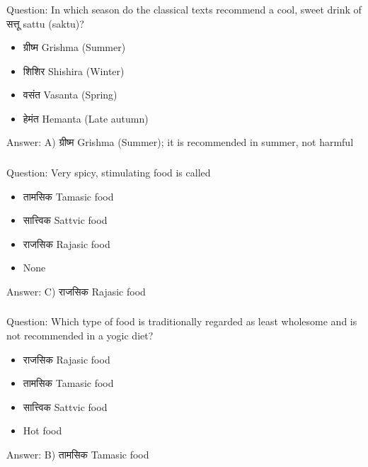 \begin{frame}[fragile]\frametitle{}

Question: In which season do the classical texts recommend a cool, sweet drink of सत्तू sattu (saktu)?

\begin{itemize}
\item[A)] ग्रीष्म Grishma (Summer)
\item[B)] शिशिर Shishira (Winter)
\item[C)] वसंत Vasanta (Spring)
\item[D)] हेमंत Hemanta (Late autumn)
\end{itemize}

Answer: A) ग्रीष्म Grishma (Summer); it is recommended in summer, not harmful
\end{frame}

\begin{frame}[fragile]\frametitle{}

Question: Very spicy, stimulating food is called

\begin{itemize}
\item[A)] तामसिक Tamasic food
\item[B)] सात्त्विक Sattvic food
\item[C)] राजसिक Rajasic food
\item[D)] None
\end{itemize}

Answer: C) राजसिक Rajasic food
\end{frame}

\begin{frame}[fragile]\frametitle{}

Question: Which type of food is traditionally regarded as least wholesome and is not recommended in a yogic diet?

\begin{itemize}
\item[A)] राजसिक Rajasic food
\item[B)] तामसिक Tamasic food
\item[C)] सात्त्विक Sattvic food
\item[D)] Hot food
\end{itemize}

Answer: B) तामसिक Tamasic food
\end{frame}


